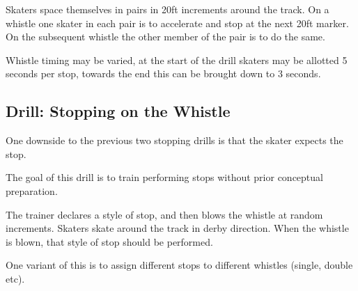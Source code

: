 Skaters space themselves in pairs in 20ft increments around the track. 
On a whistle one skater in each pair is to accelerate and stop at the next 20ft marker. 
On the subsequent whistle the other member of the pair is to do the same. 

Whistle timing may be varied, at the start of the drill skaters may be allotted 5 seconds per stop, towards the end this can be brought down to 3 seconds. 

\subsection*{Drill: Stopping on the Whistle}
One downside to the previous two stopping drills is that the skater expects the stop. 

The goal of this drill is to train performing stops without prior conceptual preparation.   

The trainer declares a style of stop, and then blows the whistle at random increments.  
Skaters skate around the track in derby direction.
When the whistle is blown, that style of stop should be performed.

One variant of this is to assign different stops to different whistles (single, double etc).
